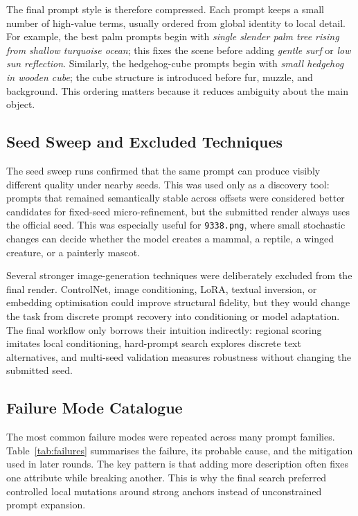 \documentclass[runningheads]{llncs}
\newcommand{\imgpath}[1]{\texttt{#1}}
\begin{document}
The final prompt style is therefore compressed. Each prompt keeps a small number of high-value terms, usually ordered from global identity to local detail. For example, the best palm prompts begin with \emph{single slender palm tree rising from shallow turquoise ocean}; this fixes the scene before adding \emph{gentle surf} or \emph{low sun reflection}. Similarly, the hedgehog-cube prompts begin with \emph{small hedgehog in wooden cube}; the cube structure is introduced before fur, muzzle, and background. This ordering matters because it reduces ambiguity about the main object.

\subsection{Seed Sweep and Excluded Techniques}

The seed sweep runs confirmed that the same prompt can produce visibly different quality under nearby seeds. This was used only as a discovery tool: prompts that remained semantically stable across offsets were considered better candidates for fixed-seed micro-refinement, but the submitted render always uses the official seed. This was especially useful for \imgpath{9338.png}, where small stochastic changes can decide whether the model creates a mammal, a reptile, a winged creature, or a painterly mascot.

Several stronger image-generation techniques were deliberately excluded from the final render. ControlNet, image conditioning, LoRA, textual inversion, or embedding optimisation could improve structural fidelity, but they would change the task from discrete prompt recovery into conditioning or model adaptation. The final workflow only borrows their intuition indirectly: regional scoring imitates local conditioning, hard-prompt search explores discrete text alternatives, and multi-seed validation measures robustness without changing the submitted seed.

\subsection{Failure Mode Catalogue}

The most common failure modes were repeated across many prompt families. Table~\ref{tab:failures} summarises the failure, its probable cause, and the mitigation used in later rounds. The key pattern is that adding more description often fixes one attribute while breaking another. This is why the final search preferred controlled local mutations around strong anchors instead of unconstrained prompt expansion.
\end{document}
